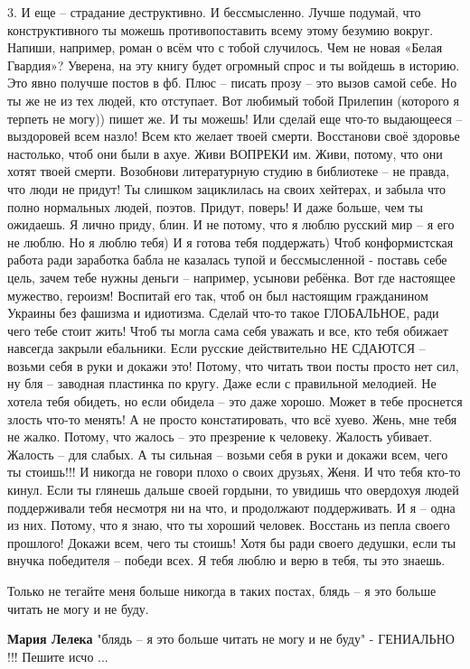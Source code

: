 \begin{itemize}
3. И еще – страдание деструктивно. И бессмысленно. Лучше подумай, что
конструктивного ты можешь противопоставить всему этому безумию вокруг. Напиши,
например, роман о всём что с тобой случилось. Чем не новая «Белая Гвардия»?
Уверена, на эту книгу будет огромный спрос и ты войдешь в историю. Это явно
получше постов в фб. Плюс – писать прозу – это вызов самой себе. Но ты же не из
тех людей, кто отступает. Вот любимый тобой Прилепин (которого я терпеть не
могу)) пишет же. И ты можешь! Или сделай еще что-то выдающееся – выздоровей
всем назло! Всем кто желает твоей смерти. Восстанови своё здоровье настолько,
чтоб они были в ахуе. Живи ВОПРЕКИ им. Живи, потому, что они хотят твоей
смерти. Возобнови литературную студию в библиотеке – не правда, что люди не
придут! Ты слишком зациклилась на своих хейтерах, и забыла что полно нормальных
людей, поэтов. Придут, поверь! И даже больше, чем ты ожидаешь. Я лично приду,
блин. И не потому, что я люблю русский мир – я его не люблю. Но я люблю тебя) И
я готова тебя поддержать) Чтоб конформистская работа ради заработка бабла не
казалась тупой и бессмысленной - поставь себе цель, зачем тебе нужны деньги –
например, усынови ребёнка. Вот где настоящее мужество, героизм! Воспитай его
так, чтоб он был настоящим гражданином Украины без фашизма и идиотизма. Сделай
что-то такое ГЛОБАЛЬНОЕ, ради чего тебе стоит жить! Чтоб ты могла сама себя
уважать и все, кто тебя обижает навсегда закрыли ебальники. Если русские
действительно НЕ СДАЮТСЯ – возьми себя в руки и докажи это! Потому, что читать
твои посты просто нет сил, ну бля – заводная пластинка по кругу. Даже если с
правильной мелодией. Не хотела тебя обидеть, но если обидела – это даже хорошо.
Может в тебе проснется злость что-то менять! А не просто констатировать, что
всё хуево. Жень, мне тебя не жалко. Потому, что жалось – это презрение к
человеку. Жалость убивает. Жалость – для слабых. А ты сильная – возьми себя в
руки и докажи всем, чего ты стоишь!!! И никогда не говори плохо о своих
друзьях, Женя. И что тебя кто-то кинул. Если ты глянешь дальше своей гордыни,
то увидишь что овердохуя людей поддерживали тебя несмотря ни на что, и
продолжают поддерживать. И я – одна из них. Потому, что я знаю, что ты хороший
человек. Восстань из пепла своего прошлого! Докажи всем, чего ты стоишь! Хотя
бы ради своего дедушки, если ты внучка победителя – победи всех. Я тебя люблю и
верю в тебя, ты это знаешь.

Только не тегайте меня больше никогда в таких постах, блядь – я это больше читать не могу и не буду.


\textbf{Мария Лелека} "блядь – я это больше читать не могу и не буду" - ГЕНИАЛЬНО !!! Пешите исчо ...
\end{itemize} %
